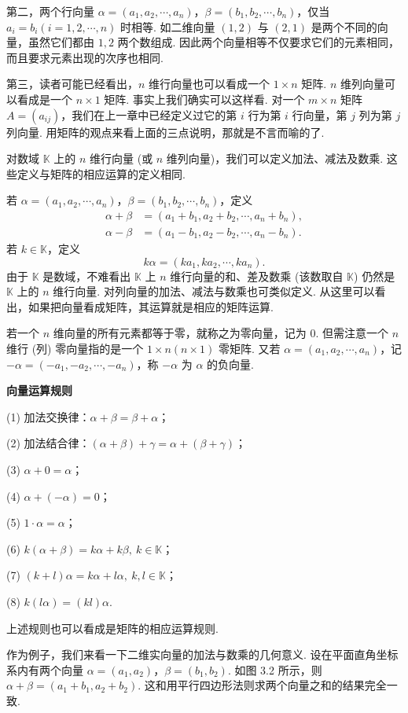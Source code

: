 \documentclass[UTF8,12pt,a4paper,fontset=fandol]{ctexart}
\begin{document}
第二，两个行向量 $\alpha=(a_1,a_2,\cdots,a_n)$，$\beta=(b_1,b_2,\cdots,b_n)$，仅当 $a_i=b_i(i=1,2,\cdots,n)$ 时相等. 如二维向量 $(1,2)$ 与 $(2,1)$ 是两个不同的向量，虽然它们都由 $1,2$ 两个数组成. 因此两个向量相等不仅要求它们的元素相同，而且要求元素出现的次序也相同.

第三，读者可能已经看出，$n$ 维行向量也可以看成一个 $1\times n$ 矩阵. $n$ 维列向量可以看成是一个 $n\times 1$ 矩阵. 事实上我们确实可以这样看. 对一个 $m\times n$ 矩阵 $A=(a_{ij})$，我们在上一章中已经定义过它的第 $i$ 行为第 $i$ 行向量，第 $j$ 列为第 $j$ 列向量. 用矩阵的观点来看上面的三点说明，那就是不言而喻的了.

对数域 $\mathbb{K}$ 上的 $n$ 维行向量 (或 $n$ 维列向量)，我们可以定义加法、减法及数乘. 这些定义与矩阵的相应运算的定义相同.

若 $\alpha=(a_1,a_2,\cdots,a_n)$，$\beta=(b_1,b_2,\cdots,b_n)$，定义
\[
\begin{aligned}
\alpha+\beta&=(a_1+b_1,a_2+b_2,\cdots,a_n+b_n),\\
\alpha-\beta&=(a_1-b_1,a_2-b_2,\cdots,a_n-b_n).
\end{aligned}
\]
若 $k\in\mathbb{K}$，定义
\[
k\alpha=(ka_1,ka_2,\cdots,ka_n).
\]
由于 $\mathbb{K}$ 是数域，不难看出 $\mathbb{K}$ 上 $n$ 维行向量的和、差及数乘 (该数取自 $\mathbb{K}$) 仍然是 $\mathbb{K}$ 上的 $n$ 维行向量. 对列向量的加法、减法与数乘也可类似定义. 从这里可以看出，如果把向量看成矩阵，其运算就是相应的矩阵运算.

若一个 $n$ 维向量的所有元素都等于零，就称之为零向量，记为 $0$. 但需注意一个 $n$ 维行 (列) 零向量指的是一个 $1\times n(n\times 1)$ 零矩阵. 又若 $\alpha=(a_1,a_2,\cdots,a_n)$，记 $-\alpha=(-a_1,-a_2,\cdots,-a_n)$，称 $-\alpha$ 为 $\alpha$ 的负向量.

\noindent\textbf{向量运算规则}

(1) 加法交换律：$\alpha+\beta=\beta+\alpha$；

(2) 加法结合律：$(\alpha+\beta)+\gamma=\alpha+(\beta+\gamma)$；

(3) $\alpha+0=\alpha$；

(4) $\alpha+(-\alpha)=0$；

(5) $1\cdot\alpha=\alpha$；

(6) $k(\alpha+\beta)=k\alpha+k\beta,\ k\in\mathbb{K}$；

(7) $(k+l)\alpha=k\alpha+l\alpha,\ k,l\in\mathbb{K}$；

(8) $k(l\alpha)=(kl)\alpha$.

上述规则也可以看成是矩阵的相应运算规则.

作为例子，我们来看一下二维实向量的加法与数乘的几何意义. 设在平面直角坐标系内有两个向量 $\alpha=(a_1,a_2)$，$\beta=(b_1,b_2)$. 如图 3.2 所示，则 $\alpha+\beta=(a_1+b_1,a_2+b_2)$. 这和用平行四边形法则求两个向量之和的结果完全一致.
\end{document}
